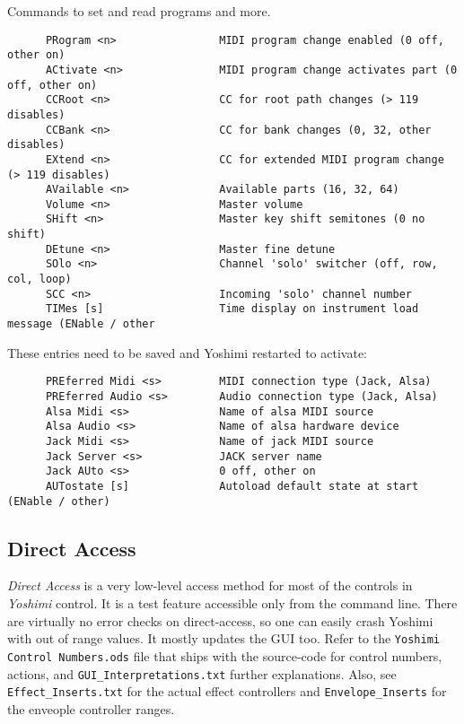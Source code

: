    Commands to set and read programs and more.

\begin{verbatim}
      PRogram <n>                MIDI program change enabled (0 off, other on)
      ACtivate <n>               MIDI program change activates part (0 off, other on)
      CCRoot <n>                 CC for root path changes (> 119 disables)
      CCBank <n>                 CC for bank changes (0, 32, other disables)
      EXtend <n>                 CC for extended MIDI program change (> 119 disables)
      AVailable <n>              Available parts (16, 32, 64)
      Volume <n>                 Master volume
      SHift <n>                  Master key shift semitones (0 no shift)
      DEtune <n>                 Master fine detune
      SOlo <n>                   Channel 'solo' switcher (off, row, col, loop)
      SCC <n>                    Incoming 'solo' channel number
      TIMes [s]                  Time display on instrument load message (ENable / other
\end{verbatim}

      These entries need to be saved and Yoshimi restarted to activate:

\begin{verbatim}
      PREferred Midi <s>         MIDI connection type (Jack, Alsa)
      PREferred Audio <s>        Audio connection type (Jack, Alsa)
      Alsa Midi <s>              Name of alsa MIDI source
      Alsa Audio <s>             Name of alsa hardware device
      Jack Midi <s>              Name of jack MIDI source
      Jack Server <s>            JACK server name
      Jack AUto <s>              0 off, other on
      AUTostate [s]              Autoload default state at start (ENable / other)
\end{verbatim}

\subsection{Direct Access}
\label{subsec:command_line_direct_access}

   \textsl{Direct Access} is a very low-level access method for most of the
   controls in \textsl{Yoshimi} control.
   It is a test feature accessible only from the command line.
   There are virtually no error checks on direct-access, so one can easily
   crash Yoshimi with out of range values.
   It mostly updates the GUI too.
   Refer to the \texttt{Yoshimi Control Numbers.ods} file that ships with the
   source-code
   for control numbers, actions, and \texttt{GUI\_Interpretations.txt}
   further explanations.
   Also, see \texttt{Effect\_Inserts.txt} for the actual effect controllers and
   \texttt{Envelope\_Inserts} for the enveople controller ranges.

